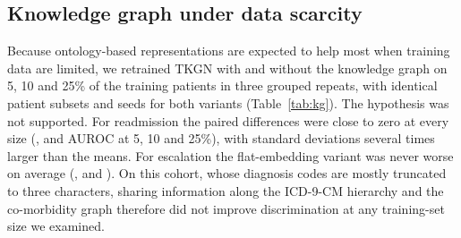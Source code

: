 \subsection{Knowledge graph under data scarcity}
\label{sec:kgeff}
Because ontology-based representations are expected to help most when
training data are limited, we retrained TKGN with and without the knowledge
graph on 5, 10 and 25\% of the training patients in three grouped repeats,
with identical patient subsets and seeds for both variants
(Table~\ref{tab:kg}). The hypothesis was not supported. For readmission the
paired differences were close to zero at every size (\KgReadmitFive{},
\KgReadmitTen{} and \KgReadmitTwentyFive{} AUROC at 5, 10 and 25\%), with
standard deviations several times larger than the means. For escalation the
flat-embedding variant was never worse on average (\KgEscFive{},
\KgEscTen{} and \KgEscTwentyFive{}). On this cohort, whose diagnosis codes
are mostly truncated to three characters, sharing information along the
ICD-9-CM hierarchy and the co-morbidity graph therefore did not improve
discrimination at any training-set size we examined.

\begin{table}[t]
  \centering
  \caption{TKGN with and without the knowledge graph (KG) trained on subsets
  of the training patients. Mean test AUROC over three grouped repeats with
  paired subsets and seeds; $\Delta$ = TKGN minus TKGN without KG; Wins:
  repeats in which the KG variant was better.}
  \label{tab:kg}
  \scriptsize
  \setlength{\tabcolsep}{3pt}
  
\end{table}
